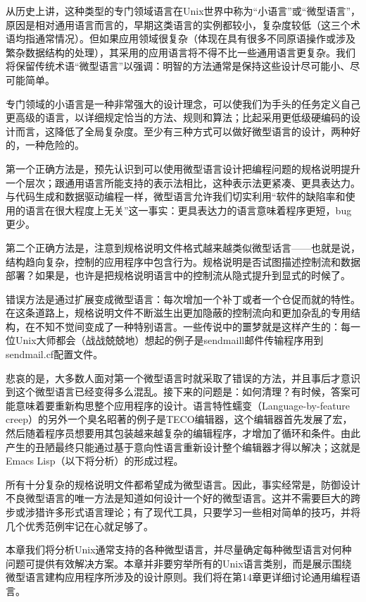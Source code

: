 \documentclass[12pt,oneside]{book}
\begin{document}
从历史上讲，这种类型的专门领域语言在Unix世界中称为“小语言”或“微型语言”，原因是相对通用语言而言的，早期这类语言的实例都较小，复杂度较低（这三个术语均指通常情况）。但如果应用领域很复杂（体现在具有很多不同原语操作或涉及繁杂数据结构的处理），其采用的应用语言将不得不比一些通用语言更复杂。我们将保留传统术语“微型语言”以强调：明智的方法通常是保持这些设计尽可能小、尽可能简单。

专门领域的小语言是一种非常强大的设计理念，可以使我们为手头的任务定义自己更高级的语言，以详细规定恰当的方法、规则和算法；比起采用更低级硬编码的设计而言，这降低了全局复杂度。至少有三种方式可以做好微型语言的设计，两种好的，一种危险的。

第一个正确方法是，预先认识到可以使用微型语言设计把编程问题的规格说明提升一个层次；跟通用语言所能支持的表示法相比，这种表示法更紧凑、更具表达力。与代码生成和数据驱动编程一样，微型语言允许我们切实利用“软件的缺陷率和使用的语言在很大程度上无关”这一事实：更具表达力的语言意味着程序更短，bug更少。

第二个正确方法是，注意到规格说明文件格式越来越类似微型话言——也就是说，结构趋向复杂，控制的应用程序中包含行为。规格说明是否试图描述控制流和数据部署？如果是，也许是把规格说明语言中的控制流从隐式提升到显式的时候了。

错误方法是通过扩展变成微型语言：每次增加一个补丁或者一个仓促而就的特性。在这条道路上，规格说明文件不断滋生出更加隐蔽的控制流向和更加杂乱的专用结构，在不知不觉间变成了一种特别语言。一些传说中的噩梦就是这样产生的：每一位Unix大师都会（战战兢兢地）想起的例子是sendmaill邮件传输程序用到sendmail.cf配置文件。

悲哀的是，大多数人面对第一个微型语言时就采取了错误的方法，并且事后才意识到这个微型语言已经变得多么混乱。接下来的问题是：如何清理？有时候，答案可能意味着要重新构思整个应用程序的设计。语言特性蠕变（Language-by-feature creep）的另外一个臭名昭著的例子是TECO编辑器，这个编辑器首先发展了宏，然后随着程序员想要用其包装越来越复杂的编辑程序，才增加了循环和条件。由此产生的丑陋最终只能通过基于意向性语言重新设计整个编辑器才得以解决；这就是Emacs Lisp（以下将分析）的形成过程。

所有十分复杂的规格说明文件都希望成为微型语言。因此，事实经常是，防御设计不良微型语言的唯一方法是知道如何设计一个好的微型语言。这并不需要巨大的跨步或涉猎许多形式语言理论；有了现代工具，只要学习一些相对简单的技巧，并将几个优秀范例牢记在心就足够了。

本章我们将分析Unix通常支持的各种微型语言，并尽量确定每种微型语言对何种问题可提供有效解决方案。本章并非要穷举所有的Unix语言类别，而是展示围绕微型语言建构应用程序所涉及的设计原则。我们将在第14章更详细讨论通用编程语言。
\end{document}
